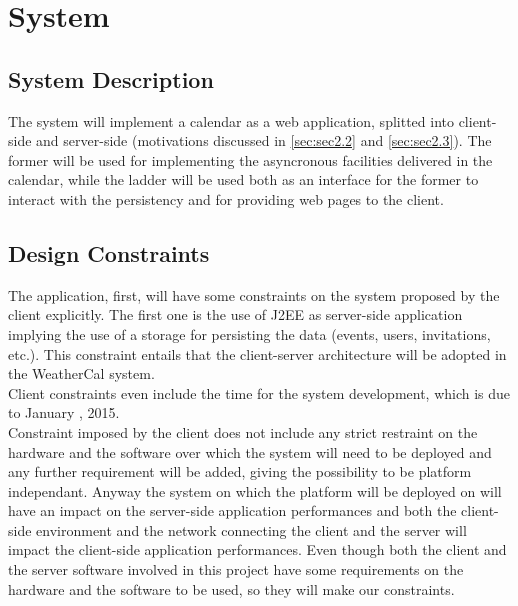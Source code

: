 \chapter{System} \label{cap:cap2}

\section{System Description}
The system will implement a calendar as a web application, splitted into client-side and server-side (motivations discussed in \autoref{sec:sec2.2} and \autoref{sec:sec2.3}). The former will be used for implementing the asyncronous facilities delivered in the calendar, while the ladder will be used both as an interface for the former to interact with the persistency and for providing web pages to the client.

\section{Design Constraints} \label{sec:sec2.2}
The application, first, will have some constraints on the system proposed by the client explicitly. The first one is the use of J2EE as server-side application implying the use of a storage for persisting the data (events, users, invitations, etc.). This constraint entails that the client-server architecture will be adopted in the WeatherCal system.\\
Client constraints even include the time for the system development, which is due to January , 2015.\\
Constraint imposed by the client does not include any strict restraint on the hardware and the software over which the system will need to be deployed and any further requirement will be added, giving the possibility to be platform independant. Anyway the system on which the platform will be deployed on will have an impact on the server-side application performances and both the client-side environment and the network connecting the client and the server will impact the client-side application performances. Even though both the client and the server software involved in this project have some requirements on the hardware and the software to be used, so they will make our constraints.

